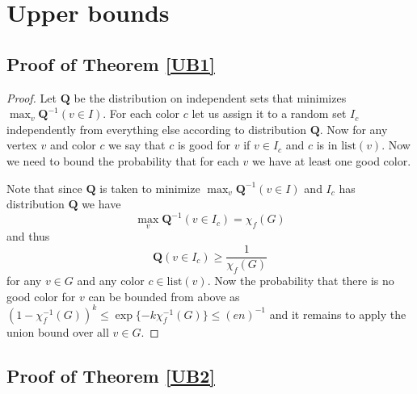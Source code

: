 \documentclass[10pt,a4paper]{article}
\theoremstyle{remark}
\theoremstyle{definition}
\newcommand{\mQ}{\mathbf{Q}}
\newcommand{\lst}{\mathrm{list}}
\begin{document}
\section{Upper bounds}

\subsection{Proof of Theorem \ref{UB1}}

\begin{proof}
    Let $\mathbf{Q}$ be the distribution on independent sets that minimizes $\max_{v} \mQ^{-1}(v \in I)$. For each color $c$ let us assign it to a random set $I_c$ independently from everything else according to distribution $\mQ$. Now for any vertex $v$ and color $c$ we say that $c$ is good for $v$ if $v \in I_c$ and $c$ is in $\lst(v)$. Now we need to bound the probability that for each $v$ we have at least one good color. 
    
    Note that since $\mQ$ is taken to minimize $\max_{v} \mQ^{-1}(v \in I)$ and $I_c$ has distribution $\mQ$ we have $$\max_{v} \mQ^{-1}(v \in I_c) = \chi_f(G)$$ and thus
    $$
        \mQ(v \in I_c) \geq \frac{1}{\chi_f(G)}
    $$
    for any $v \in G$ and any color $c \in \lst(v)$. Now the probability that there is no good color for $v$ can be bounded from above as $(1 - \chi_f^{-1}(G))^{k} \leq \exp\{-k\chi_f^{-1}(G)\} \leq (en)^{-1}$ and it remains to apply the union bound over all $v \in G$.
\end{proof}

\subsection{Proof of Theorem \ref{UB2}}
\end{document}
